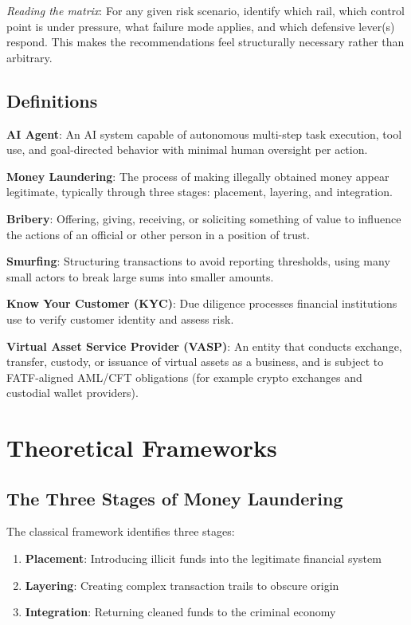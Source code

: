 \documentclass[11pt,letterpaper]{article}
\begin{document}
\textit{Reading the matrix}: For any given risk scenario, identify which rail, which control point is under pressure, what failure mode applies, and which defensive lever(s) respond. This makes the recommendations feel structurally necessary rather than arbitrary.

\subsection{Definitions}

\begin{defbox}
\textbf{AI Agent}: An AI system capable of autonomous multi-step task execution, tool use, and goal-directed behavior with minimal human oversight per action.

\textbf{Money Laundering}: The process of making illegally obtained money appear legitimate, typically through three stages: placement, layering, and integration.

\textbf{Bribery}: Offering, giving, receiving, or soliciting something of value to influence the actions of an official or other person in a position of trust.

\textbf{Smurfing}: Structuring transactions to avoid reporting thresholds, using many small actors to break large sums into smaller amounts.

\textbf{Know Your Customer (KYC)}: Due diligence processes financial institutions use to verify customer identity and assess risk.

\textbf{Virtual Asset Service Provider (VASP)}: An entity that conducts exchange, transfer, custody, or issuance of virtual assets as a business, and is subject to FATF-aligned AML/CFT obligations (for example crypto exchanges and custodial wallet providers).
\end{defbox}

\section{Theoretical Frameworks}

\subsection{The Three Stages of Money Laundering}

The classical framework identifies three stages:
\begin{enumerate}
  \item \textbf{Placement}: Introducing illicit funds into the legitimate financial system
  \item \textbf{Layering}: Creating complex transaction trails to obscure origin
  \item \textbf{Integration}: Returning cleaned funds to the criminal economy
\end{enumerate}
\end{document}
